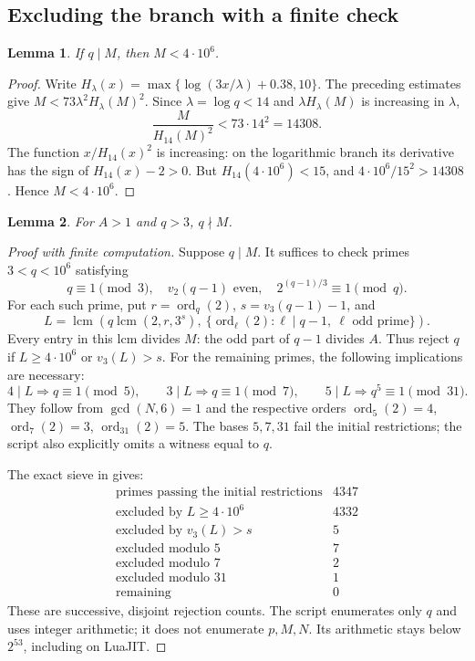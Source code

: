 \documentclass[11pt]{article}
\newtheorem{lemma}{Lemma}
\begin{document}
\subsection{Excluding the branch with a finite check}
\label{sec:q-divides-exclusion}
\begin{lemma}
If $q\mid M$, then $M<4\cdot10^6$.
\end{lemma}
\begin{proof}
Write $H_\lambda(x)=\max\{\log(3x/\lambda)+0.38,10\}$.
The preceding estimates give $M<73\lambda^2H_\lambda(M)^2$.
Since $\lambda=\log q<14$ and $\lambda H_\lambda(M)$ is increasing
in $\lambda$,
\[
\frac{M}{H_{14}(M)^2}<73\cdot14^2=14308.
\]
The function $x/H_{14}(x)^2$ is increasing: on the logarithmic
branch its derivative has the sign of $H_{14}(x)-2>0$.
But $H_{14}(4\cdot10^6)<15$, and
$4\cdot10^6/15^2>14308$. Hence $M<4\cdot10^6$.
\end{proof}

\begin{lemma}\label{lem:q-not-M}
For $A>1$ and $q>3$, $q\nmid M$.
\end{lemma}
\begin{proof}[Proof with finite computation]
Suppose $q\mid M$. It suffices to check primes $3<q<10^6$ satisfying
\[
q\equiv1\pmod3,\quad v_2(q-1)\text{ even},\quad
2^{(q-1)/3}\equiv1\pmod q.
\]
For each such prime, put $r=\operatorname{ord}_q(2)$,
$s=v_3(q-1)-1$, and
\[
L=\operatorname{lcm}\left(
q\operatorname{lcm}(2,r,3^s),\
\{\operatorname{ord}_\ell(2):\ell\mid q-1,\ \ell\text{ odd prime}\}
\right).
\]
Every entry in this lcm divides $M$: the odd part of $q-1$ divides
$A$. Thus reject $q$ if $L\ge4\cdot10^6$ or $v_3(L)>s$.
For the remaining primes, the following implications are necessary:
\[
4\mid L\Rightarrow q\equiv1\pmod5,\qquad
3\mid L\Rightarrow q\equiv1\pmod7,\qquad
5\mid L\Rightarrow q^5\equiv1\pmod{31}.
\]
They follow from $\gcd(N,6)=1$ and the respective orders
$\operatorname{ord}_5(2)=4$, $\operatorname{ord}_7(2)=3$,
$\operatorname{ord}_{31}(2)=5$. The bases $5,7,31$ fail the
initial restrictions; the script also explicitly omits a witness equal to $q$.

The exact sieve in  gives:
\[
\begin{array}{l|r}
\text{primes passing the initial restrictions}&4347\\\hline
\text{excluded by }L\ge4\cdot10^6&4332\\
\text{excluded by }v_3(L)>s&5\\
\text{excluded modulo }5&7\\
\text{excluded modulo }7&2\\
\text{excluded modulo }31&1\\\hline
\text{remaining}&0
\end{array}
\]
These are successive, disjoint rejection counts. The script enumerates
only $q$ and uses integer arithmetic; it does not enumerate $p,M,N$.
Its arithmetic stays below $2^{53}$, including on LuaJIT.
\end{proof}
\end{document}
